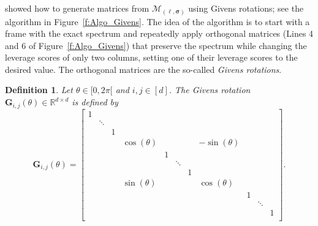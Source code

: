 \documentclass[twoside,11pt]{book}
\newtheorem{definition}{Definition}
\numberwithin{theorem}{chapter}
\numberwithin{definition}{chapter}
\numberwithin{proposition}{chapter}
\numberwithin{corollary}{chapter}
\numberwithin{example}{chapter}
\numberwithin{lemma}{chapter}
\numberwithin{assumption}{chapter}
\numberwithin{equation}{chapter}
\numberwithin{figure}{chapter}
\begin{document}
\begin{subappendices}
\cite{DhHeSuTr05} showed how to generate matrices from $\mathcal{M}_{(\bm{\ell},\bm{\sigma})}$ using Givens rotations; see the algorithm in Figure~\ref{f:Algo_Givens}. The idea of the algorithm is to start with a frame with the exact spectrum and repeatedly apply orthogonal matrices (Lines 4 and 6 of Figure~\ref{f:Algo_Givens}) that preserve the spectrum while changing the leverage scores of only two columns, setting one of their leverage scores to the desired value. The orthogonal matrices are the so-called \emph{Givens rotations}.
\begin{definition}
Let $\theta \in [0, 2\pi[$ and $i,j \in [d]$. The Givens rotation $\bm{G}_{i,j}(\theta) \in \mathbb{R}^{d \times d}$ is defined by
\begin{equation}
\bm{G}_{i,j}(\theta)  = \begin{bmatrix}
    1 & & & & & & & & & & \\
     & \ddots  & & & & & & & & & \\
     &  & 1 & & & & & & & &  \\
     &  &  &  \cos(\theta)&  &  & & -\sin(\theta)& & & \\
     &  &  &  & 1 &   & & & & & \\
     &  &  &  &  & \ddots  & & & & & \\
     &  &  &  &  &   & 1 & & & & \\
     &  &  &  \sin(\theta)&  &  & & \cos(\theta)& & & \\
     &  & & & & & & &1 & & \\
     &   & & & & & & & &\ddots & \\
     &  &  & & & & & & & & 1 \\
    \end{bmatrix}.
\end{equation}

\end{definition}





\end{subappendices}
\end{document}
